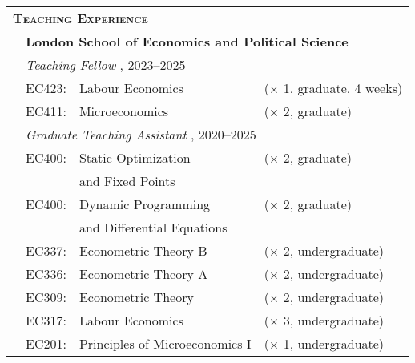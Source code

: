 \begin{tabular}{llll}
	
	\multicolumn{3}{l}{
		\large
		\textbf{%
			\textsc{%
				Teaching Experience
			}
		}
	}
	\\[2ex]
	
	\indent
	&
	\multicolumn{3}{l}{
		\textbf{%
			London School of Economics and Political Science
		}
	}
	\\[1.5ex]
	
	&
	\multicolumn{3}{l}{
		\textit{%
			Teaching Fellow%
		}%
		,
		2023--2025
	}
	\\[.5ex]
	
	& EC423:
	& Labour Economics
	& ($\times$ 1, graduate, 4 weeks)
	\\
	
	& EC411:
	& Microeconomics
	& ($\times$ 2, graduate)
	\\[1em]
	
	&
	\multicolumn{3}{l}{
		\textit{%
			Graduate Teaching Assistant%
		}%
		,
		2020--2025
	}
	\\[.5ex]
	
	& EC400:
	& Static Optimization
	& ($\times$ 2, graduate)
	\\
	
	& 
	& and Fixed Points
	& 
	\\
	
	& EC400:
	& Dynamic Programming
	& ($\times$ 2, graduate)
	\\
	& 
	& and Differential Equations
	& 
	\\
	
	& EC337:
	& Econometric Theory B
	& ($\times$ 2, undergraduate)
	\\%
	
	& EC336:
	& Econometric Theory A
	& ($\times$ 2, undergraduate)
	\\%
	
	& EC309:
	& Econometric Theory
	& ($\times$ 2, undergraduate)
	\\%
	
	& EC317:
	& Labour Economics
	& ($\times$ 3, undergraduate)
	\\%
	
	& EC201:
	& Principles of Microeconomics I
	& ($\times$ 1, undergraduate)
	\\[1em]

\end{tabular}

